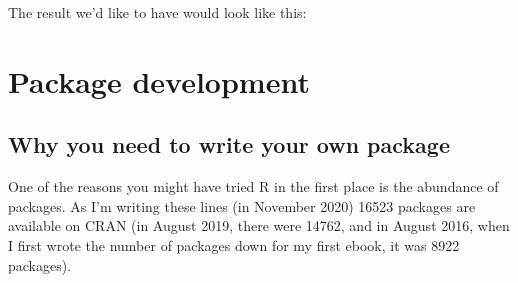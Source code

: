 \documentclass[
]{article}
\newenvironment{Shaded}{\begin{snugshade}}{\end{snugshade}}
\newcommand{\DecValTok}[1]{\textcolor[rgb]{0.00,0.00,0.81}{#1}}
\newcommand{\NormalTok}[1]{#1}
\newcommand{\SpecialCharTok}[1]{\textcolor[rgb]{0.00,0.00,0.00}{#1}}
\newcommand{\StringTok}[1]{\textcolor[rgb]{0.31,0.60,0.02}{#1}}
\begin{document}
The result we'd like to have would look like this:

\begin{Shaded}
\end{Shaded}

\hypertarget{package-development}{%
\section{Package development}\label{package-development}}

\hypertarget{why-you-need-to-write-your-own-package}{%
\subsection{Why you need to write your own package}\label{why-you-need-to-write-your-own-package}}

One of the reasons you might have tried R in the first place is the abundance of packages. As I'm
writing these lines (in November 2020) 16523 packages are available on CRAN (in August 2019, there
were 14762, and in August 2016, when I first wrote the number of packages down for my first ebook,
it was 8922 packages).
\end{document}
